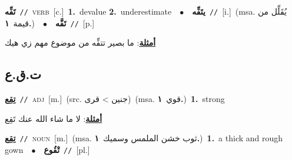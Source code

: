 \documentclass[10pt,a4paper,twoside]{article} %
\begin{document}
\begin{multicols}{2}
{{{{{{{{{{{{\setlength\topsep{0pt}\textbf{\foreignlanguage{arabic}{تَفِّه}}\ {\color{gray}\texttt{//}\color{black}}\ \textsc{verb}\ [c.]\ \textbf{1.}~devalue  \textbf{2.}~underestimate\ \ $\bullet$\ \ \setlength\topsep{0pt}\textbf{\foreignlanguage{arabic}{يتَفِّه}}\ {\color{gray}\texttt{//}\color{black}}\ [i.]\ \color{gray}(msa. \foreignlanguage{arabic}{يُقَلِّل من قيمة}~\foreignlanguage{arabic}{\textbf{١.}})\color{black}\ \ $\bullet$\ \ \setlength\topsep{0pt}\textbf{\foreignlanguage{arabic}{تَفَّه}}\ {\color{gray}\texttt{//}\color{black}}\ [p.]\  \begin{flushright}\color{gray}\foreignlanguage{arabic}{\textbf{\underline{\foreignlanguage{arabic}{أمثلة}}}: ما بصير تتفِّه من موضوع مهم زي هيك}\end{flushright}\color{black}} \vspace{2mm}

\vspace{-3mm}
\subsection*{\color{blue}\foreignlanguage{arabic}{ت.ق.ع}\color{blue}{ (ntws)}} 

{\setlength\topsep{0pt}\textbf{\foreignlanguage{arabic}{تِقِع}}\ {\color{gray}\texttt{//}\color{black}}\ \textsc{adj}\ [m.]\ (src. \color{gray}\foreignlanguage{arabic}{جنين > قرى}\color{black})\ \color{gray}(msa. \foreignlanguage{arabic}{قوي}~\foreignlanguage{arabic}{\textbf{١.}})\color{black}\ \textbf{1.}~strong\  \begin{flushright}\color{gray}\foreignlanguage{arabic}{\textbf{\underline{\foreignlanguage{arabic}{أمثلة}}}: لا ما شاء الله عنك تَقِع}\end{flushright}\color{black}} \vspace{2mm}

{\setlength\topsep{0pt}\textbf{\foreignlanguage{arabic}{تِقِع}}\ {\color{gray}\texttt{//}\color{black}}\ \textsc{noun}\ [m.]\ \color{gray}(msa. \foreignlanguage{arabic}{ثوب خشن الملمس وسميك}~\foreignlanguage{arabic}{\textbf{١.}})\color{black}\ \textbf{1.}~a thick and rough gown\ \ $\bullet$\ \ \setlength\topsep{0pt}\textbf{\foreignlanguage{arabic}{تْقُوع}}\ {\color{gray}\texttt{//}\color{black}}\ [pl.]\ 

}}}}}}}}}}}}
\end{multicols}
\end{document}
